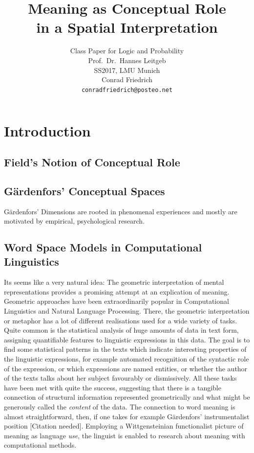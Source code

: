 \documentclass[11pt, a4paper]{scrartcl}
\title{\osfamily\textbf{Meaning as Conceptual Role}\\ in a Spatial Interpretation}
\author{Class Paper for Logic and Probability \\ Prof.\ Dr.\ Hannes Leitgeb \\ SS2017, LMU Munich \\ Conrad Friedrich \\ \texttt{conradfriedrich@posteo.net}}
\renewcommand{\i}[1]{\emph{#1}}
\begin{document}
\maketitle
{}
\thispagestyle{empty}
\newpage
\tableofcontents
\newpage
\section{Introduction}

\subsection{Field's Notion of Conceptual Role}
\subsection{Gärdenfors' Conceptual Spaces}
Gärdenfors' Dimensions are rooted in phenomenal experiences and mostly are motivated by empirical, psychological research.
\subsection{Word Space Models in Computational Linguistics}
Its seems like a very natural idea: The geometric interpretation of mental representations provides a promising attempt at an explication of meaning. Geometric approaches have been extraordinarily popular in Computational Linguistics and Natural Language Processing. There, the geometric interpretation or metaphor has a lot of different realisations used for a wide variety of tasks. Quite common is the statistical analysis of huge amounts of data in text form, assigning quantifiable features to linguistic expressions in this data. The goal is to find some statistical patterns in the texts which indicate interesting properties of the linguistic expressions, for example automated recognition of the syntactic role of the expression, or which expressions are named entities, or whether the author of the texts talks about her subject favourably or dismissively. All these tasks have been met with quite the success, suggesting that there is a tangible connection of structural information represented geometrically and what might be generously called the \i{content} of the data. The connection to word meaning is almost straightforward, then, if one takes for example Gärdenfors' instrumentalist position [Citation needed]. Employing a Wittgensteinian functionalist picture of meaning as language \i{use}, the linguist is enabled to research about meaning with computational methods.
\end{document}
